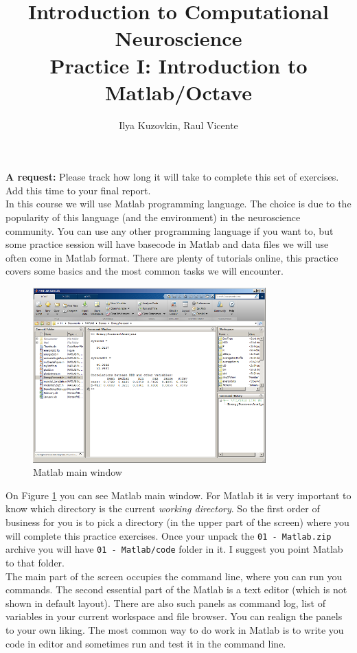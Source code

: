 \documentclass[a4paper,11pt]{article}
\author{\large{Ilya Kuzovkin, Raul Vicente}}
\title{\huge{Introduction to Computational Neuroscience}\\\LARGE{Practice I: Introduction to Matlab/Octave}}
\begin{document}
\maketitle

\textbf{A request:} Please track how long it will take to complete this set of exercises. Add this time to your final report.
\ \\

In this course we will use Matlab programming language. The choice is due to the popularity of this language (and the environment) in the neuroscience community. You can use any other programming language if you want to, but some practice session will have basecode in Matlab and data files we will use often come in Matlab format. There are plenty of tutorials online, this practice covers some basics and the most common tasks we will encounter.
\ \\


%
%
\begin{figure}[H]
   \centering
   \includegraphics[width=0.8\textwidth]{matlab.png} 
   \caption{Matlab main window}
   \label{fig:matlabgui}
\end{figure}
On Figure \ref{fig:matlabgui} you can see Matlab main window. For Matlab it is very important to know which directory is the current \emph{working directory}. So the first order of business for you is to pick a directory (in the upper part of the screen) where you will complete this practice exercises. Once your unpack the \texttt{01 - Matlab.zip} archive you will have \texttt{01 - Matlab/code} folder in it. I suggest you point Matlab to that folder.\\

The main part of the screen occupies the command line, where you can run you commands. The second essential part of the Matlab is a text editor (which is not shown in default layout). There are also such panels as command log, list of variables in your current workspace and file browser. You can realign the panels to your own liking. The most common way to do work in Matlab is to write you code in editor and sometimes run and test it in the command line.\\
\end{document}
